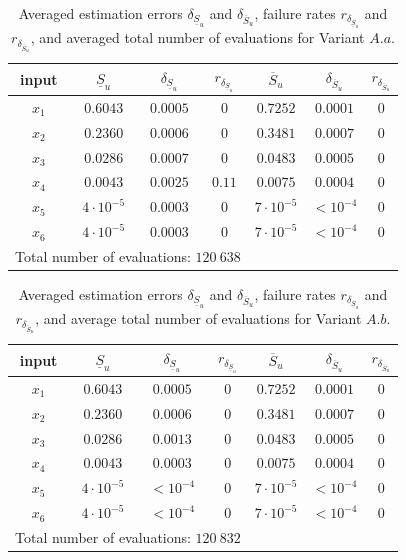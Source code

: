 \setlength{\tabcolsep}{5.5pt}
\renewcommand{\arraystretch}{1.25}
\begin{table}[t]
\caption{Averaged estimation errors $\delta_{\underline{S}_u}$ and $\delta_{\overline{S}_u}$, failure rates $r_{\delta_{\underline{S}_u}}$ and $r_{\delta_{\overline{S}_u}}$, and averaged total number of evaluations for Variant $A.a$.}
\centering
\begin{tabular}{ccccccc}
\hline
 input & $\underline{S}_u$ & $\delta_{\underline{S}_u}$ & $r_{\delta_{\underline{S}_u}}$ & $\overline{S}_u$ & $\delta_{\overline{S}_u}$ &$r_{\delta_{\overline{S}_u}}$ \\ \hline
 $x_1$ & $0.6043$ &  $0.0005$ & $0$ & $0.7252$ & $0.0001$ & $0$ \\ \hline
 $x_2$ & $0.2360$ &  $0.0006$ & $0$ & $0.3481$ & $0.0007$ & $0$ \\ \hline
 $x_3$ & $0.0286$ &  $0.0007$ & $0$ & $0.0483$ & $0.0005$ & $0$ \\ \hline
 $x_4$ & $0.0043$ &  $0.0025$ & $0.11$ & $0.0075$ & $0.0004$ & $0$ \\ \hline
 $x_5$ & $4\cdot 10^{-5}$ & $0.0003$ & $0$ & $7\cdot 10^{-5}$ & $< 10^{-4}$ & $0$ \\ \hline
 $x_6$ & $4\cdot 10^{-5}$ & $0.0003$ & $0$  & $7\cdot 10^{-5}$ & $< 10^{-4}$ & $0$ \\ \hline \hline
\multicolumn{4}{l}{Total number of evaluations: $120 \ 638$} & & &\\ \hline 
\end{tabular}
\label{res.gfunc.Aa}
\end{table}
\begin{table}[t]
\caption{Averaged estimation errors $\delta_{\underline{S}_u}$  and $\delta_{\overline{S}_u}$, failure rates $r_{\delta_{\underline{S}_u}}$ and $r_{\delta_{\overline{S}_u}}$, and average total number of evaluations for Variant $A.b$.}
\centering
\begin{tabular}{ccccccc}
\hline
 input & $\underline{S}_u$ & $\delta_{\underline{S}_u}$ & $r_{\delta_{\underline{S}_u}}$ & $\overline{S}_u$ & $\delta_{\overline{S}_u}$ &$r_{\delta_{\overline{S}_u}}$ \\ \hline
 $x_1$ & $0.6043$ &  $0.0005$ & $0$ & $0.7252$ & $0.0001$ & $0$ \\ \hline
 $x_2$ & $0.2360$ &  $0.0006$ & $0$ & $0.3481$ & $0.0007$ & $0$ \\ \hline
 $x_3$ & $0.0286$ &  $0.0013$ & $0$ & $0.0483$ & $0.0005$ & $0$ \\ \hline
 $x_4$ & $0.0043$ &  $0.0003$ & $0$ & $0.0075$ & $0.0004$ & $0$ \\ \hline
 $x_5$ & $4\cdot 10^{-5}$ & $< 10^{-4}$ & $0$ & $7\cdot 10^{-5}$ & $< 10^{-4}$ & $0$ \\ \hline
 $x_6$ & $4\cdot 10^{-5}$ & $< 10^{-4}$ & $0$  & $7\cdot 10^{-5}$ & $< 10^{-4}$ & $0$ \\ \hline \hline
\multicolumn{4}{l}{Total number of evaluations: $120 \ 832$} & & &\\ \hline 
\end{tabular}
\label{res.gfunc.Ab}
\end{table}
